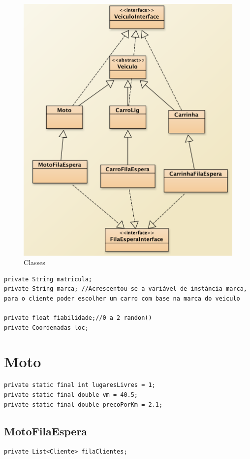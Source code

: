 \begin{figure}[htpb]
	\centering
	\includegraphics[scale=0.6]{imagem/veiculo}
	\caption{Classes }
	\label{p2:fig:p2_veiculos}
\end{figure}

\begin{verbatim}
private String matricula; 
private String marca; //Acrescentou-se a variável de instância marca, 
para o cliente poder escolher um carro com base na marca do veiculo

private float fiabilidade;//0 a 2 randon()
private Coordenadas loc;
\end{verbatim}

\section{Moto}
\begin{verbatim}
private static final int lugaresLivres = 1;
private static final double vm = 40.5; 
private static final double precoPorKm = 2.1;
\end{verbatim}

\subsection{MotoFilaEspera}
\begin{verbatim}
private List<Cliente> filaClientes;
\end{verbatim}

